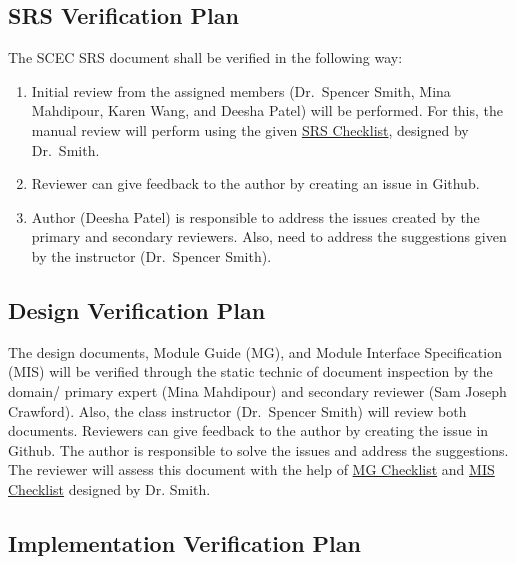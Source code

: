 \documentclass[12pt, titlepage]{article}
\begin{document}
\subsection{SRS Verification Plan}

The SCEC SRS document shall be verified in the following way: 

\begin{enumerate}

\item Initial review from the assigned members (Dr.\ Spencer Smith, Mina Mahdipour, Karen Wang, and Deesha Patel) will be performed. For this, the manual review will perform using the given \href{https://github.com/smiths/capTemplate/blob/9251702fdcb9800c59f6ed3d11d91e2bd62fca6d/docs/Checklists/SRS-Checklist.pdf}{SRS Checklist}, designed by Dr.\ Smith. 

\item Reviewer can give feedback to the author by creating an issue in Github. 

\item Author (Deesha Patel) is responsible to address the issues created by the primary and secondary reviewers. Also, need to address the suggestions given by the instructor (Dr.\ Spencer Smith).  

\end{enumerate}


\subsection{Design Verification Plan}

The design documents, Module Guide (MG), and Module Interface Specification (MIS) will be verified through the static technic of document inspection by the domain/ primary expert (Mina Mahdipour) and secondary reviewer (Sam Joseph Crawford). Also, the class instructor (Dr.\ Spencer Smith) will review both documents. Reviewers can give feedback to the author by creating the issue in Github. The author is responsible to solve the issues and address the suggestions. The reviewer will assess this document with the help of \href{https://github.com/smiths/capTemplate/blob/9251702fdcb9800c59f6ed3d11d91e2bd62fca6d/docs/Checklists/MG-Checklist.pdf}{MG Checklist} and \href{https://github.com/smiths/capTemplate/blob/9251702fdcb9800c59f6ed3d11d91e2bd62fca6d/docs/Checklists/MIS-Checklist.pdf}{MIS Checklist} designed by Dr. Smith.      

\subsection{Implementation Verification Plan}
\end{document}
